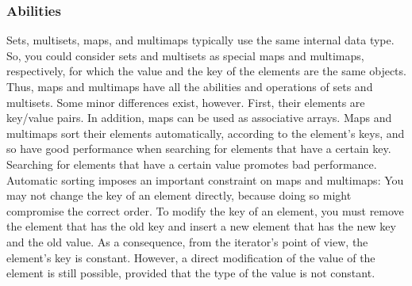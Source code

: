 \documentclass{report}
\begin{document}
\subsubsection{Abilities}
\bigbreak \noindent \bigbreak \noindent 
Sets, multisets, maps, and multimaps
typically use the same internal data type. So, you could consider sets and multisets as special maps
and multimaps, respectively, for which the value and the key of the elements are the same objects.
Thus, maps and multimaps have all the abilities and operations of sets and multisets. Some minor
differences exist, however. First, their elements are key/value pairs. In addition, maps can be used
as associative arrays.
\bigbreak \noindent 
Maps and multimaps sort their elements automatically, according to the element’s keys, and so have
good performance when searching for elements that have a certain key. Searching for elements that
have a certain value promotes bad performance. Automatic sorting imposes an important constraint
on maps and multimaps: You may not change the key of an element directly, because doing so might
compromise the correct order. To modify the key of an element, you must remove the element that
has the old key and insert a new element that has the new key and the old value. As a consequence, from the iterator’s point of view, the element’s key is
constant. However, a direct modification of the value of the element is still possible, provided that
the type of the value is not constant.

\bigbreak \noindent 
\end{document}
